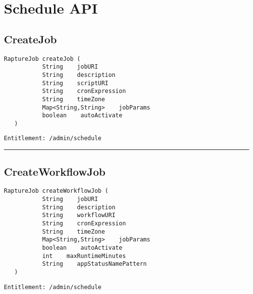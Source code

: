 \chapter{Schedule API}

\section{CreateJob}
\label{Api:CreateJob}
\begin{lstlisting}[style=nonumbers]
   RaptureJob createJob (
           String    jobURI
           String    description
           String    scriptURI
           String    cronExpression
           String    timeZone
           Map<String,String>    jobParams
           boolean    autoActivate
   )
\end{lstlisting}
\begin{Verbatim}[formatcom=\color{Maroon}]
  Entitlement: /admin/schedule
\end{Verbatim}



\rule{12cm}{2pt}
\section{CreateWorkflowJob}
\label{Api:CreateWorkflowJob}
\begin{lstlisting}[style=nonumbers]
   RaptureJob createWorkflowJob (
           String    jobURI
           String    description
           String    workflowURI
           String    cronExpression
           String    timeZone
           Map<String,String>    jobParams
           boolean    autoActivate
           int    maxRuntimeMinutes
           String    appStatusNamePattern
   )
\end{lstlisting}
\begin{Verbatim}[formatcom=\color{Maroon}]
  Entitlement: /admin/schedule
\end{Verbatim}



